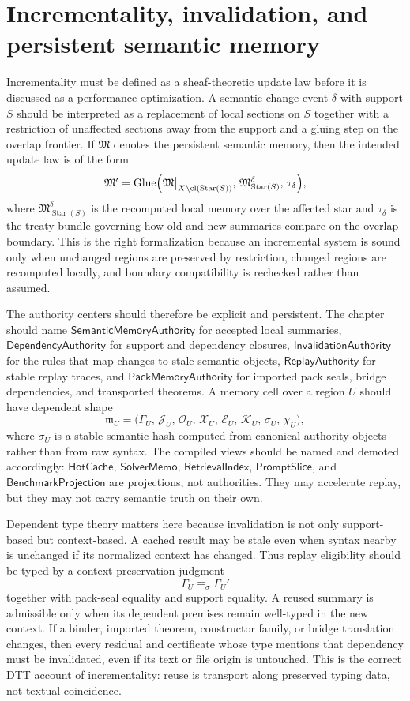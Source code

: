 \documentclass[11pt]{report}
\begin{document}
\chapter{Incrementality, invalidation, and persistent semantic memory}
Incrementality must be defined as a sheaf-theoretic update law before it is discussed as a performance optimization. A semantic change event $\delta$ with support $S$ should be interpreted as a replacement of local sections on $S$ together with a restriction of unaffected sections away from the support and a gluing step on the overlap frontier. If $\mathfrak{M}$ denotes the persistent semantic memory, then the intended update law is of the form
\[
\mathfrak{M}'
=
\operatorname{Glue}\Bigl(
\mathfrak{M}\big|_{X \setminus \operatorname{cl}(\operatorname{Star}(S))},
\,
\mathfrak{M}^{\delta}_{\operatorname{Star}(S)},
\,
\tau_{\delta}
\Bigr),
\]
where $\mathfrak{M}^{\delta}_{\operatorname{Star}(S)}$ is the recomputed local memory over the affected star and $\tau_{\delta}$ is the treaty bundle governing how old and new summaries compare on the overlap boundary. This is the right formalization because an incremental system is sound only when unchanged regions are preserved by restriction, changed regions are recomputed locally, and boundary compatibility is rechecked rather than assumed.

The authority centers should therefore be explicit and persistent. The chapter should name $\mathsf{SemanticMemoryAuthority}$ for accepted local summaries, $\mathsf{DependencyAuthority}$ for support and dependency closures, $\mathsf{InvalidationAuthority}$ for the rules that map changes to stale semantic objects, $\mathsf{ReplayAuthority}$ for stable replay traces, and $\mathsf{PackMemoryAuthority}$ for imported pack seals, bridge dependencies, and transported theorems. A memory cell over a region $U$ should have dependent shape
\[
\mathfrak{m}_U
=
\bigl(
\Gamma_U,\,
\mathcal{J}_U,\,
\mathcal{O}_U,\,
\mathcal{X}_U,\,
\mathcal{E}_U,\,
\mathcal{K}_U,\,
\sigma_U,\,
\chi_U
\bigr),
\]
where $\sigma_U$ is a stable semantic hash computed from canonical authority objects rather than from raw syntax. The compiled views should be named and demoted accordingly: $\mathsf{HotCache}$, $\mathsf{SolverMemo}$, $\mathsf{RetrievalIndex}$, $\mathsf{PromptSlice}$, and $\mathsf{BenchmarkProjection}$ are projections, not authorities. They may accelerate replay, but they may not carry semantic truth on their own.

Dependent type theory matters here because invalidation is not only support-based but context-based. A cached result may be stale even when syntax nearby is unchanged if its normalized context has changed. Thus replay eligibility should be typed by a context-preservation judgment
\[
\Gamma_U \equiv_{\sigma} \Gamma_U'
\]
together with pack-seal equality and support equality. A reused summary is admissible only when its dependent premises remain well-typed in the new context. If a binder, imported theorem, constructor family, or bridge translation changes, then every residual and certificate whose type mentions that dependency must be invalidated, even if its text or file origin is untouched. This is the correct DTT account of incrementality: reuse is transport along preserved typing data, not textual coincidence.
\end{document}
